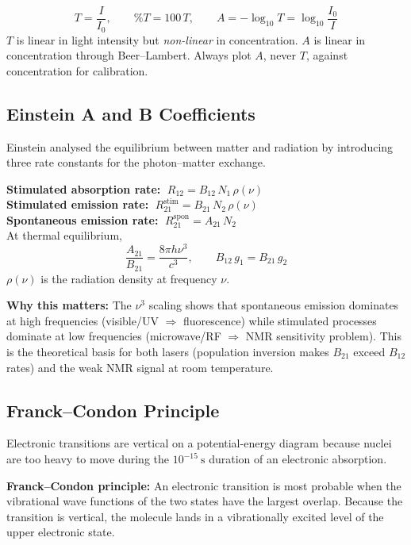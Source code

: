 \documentclass[12pt,a4paper]{article}
\begin{document}
\begin{tcolorbox}[formulabox, title={Transmittance and Absorbance}]
\[
T=\frac{I}{I_0}, \qquad \%T=100\,T, \qquad A=-\log_{10}T=\log_{10}\!\frac{I_0}{I}
\]
$T$ is linear in light intensity but \emph{non-linear} in concentration. $A$ is linear in concentration through Beer--Lambert. Always plot $A$, never $T$, against concentration for calibration.
\end{tcolorbox}

\subsection{Einstein A and B Coefficients}
Einstein analysed the equilibrium between matter and radiation by introducing three rate constants for the photon--matter exchange.

\begin{tcolorbox}[formulabox, title={Einstein Coefficients}]
\textbf{Stimulated absorption rate:} $\;R_{12}=B_{12}\,N_1\,\rho(\nu)$\\
\textbf{Stimulated emission rate:} $\;R_{21}^{\mathrm{stim}}=B_{21}\,N_2\,\rho(\nu)$\\
\textbf{Spontaneous emission rate:} $\;R_{21}^{\mathrm{spon}}=A_{21}\,N_2$\\
At thermal equilibrium,
\[
\frac{A_{21}}{B_{21}}=\frac{8\pi h\nu^{3}}{c^{3}}, \qquad B_{12}\,g_1=B_{21}\,g_2
\]
$\rho(\nu)$ is the radiation density at frequency $\nu$.
\end{tcolorbox}

\textbf{Why this matters:} The $\nu^{3}$ scaling shows that spontaneous emission dominates at high frequencies (visible/UV $\Rightarrow$ fluorescence) while stimulated processes dominate at low frequencies (microwave/RF $\Rightarrow$ NMR sensitivity problem). This is the theoretical basis for both lasers (population inversion makes $B_{21}$ exceed $B_{12}$ rates) and the weak NMR signal at room temperature.

\subsection{Franck--Condon Principle}
Electronic transitions are vertical on a potential-energy diagram because nuclei are too heavy to move during the $10^{-15}\ \mathrm{s}$ duration of an electronic absorption.

\begin{tcolorbox}[defbox]
\textbf{Franck--Condon principle:} An electronic transition is most probable when the vibrational wave functions of the two states have the largest overlap. Because the transition is vertical, the molecule lands in a vibrationally excited level of the upper electronic state.
\end{tcolorbox}
\end{document}
